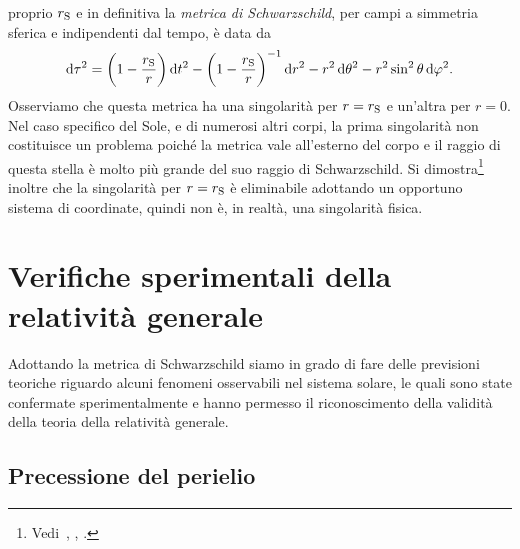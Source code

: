 proprio $r_{\textup{S}}$ e in definitiva la
\emph{metrica di Schwarzschild}, per campi a
simmetria sferica e indipendenti dal tempo, è data da
\begin{equation}
  \label{eq:metrica-schwarzschild}
  \mathop{}\!\mathrm{d}\tau^{2} = \bigg(1 - \frac{r_{\textup{S}}}{r} \bigg) \mathop{}\!\mathrm{d} t^{2} - \bigg(1 -
  \frac{r_{\textup{S}}}{r}\bigg)^{-1}\mathop{}\!\mathrm{d} r^{2} - r^{2}\mathop{}\!\mathrm{d}\theta^{2} -
  r^{2}\sin^{2}\theta \mathop{}\!\mathrm{d}\varphi^{2}.
\end{equation}
Osserviamo che questa metrica ha una singolarità per $r = r_{\textup{S}}$ e
un'altra per $r = 0$.  Nel caso specifico del Sole, e di numerosi altri corpi,
la prima singolarità non costituisce un problema poiché la metrica vale
all'esterno del corpo e il raggio di questa stella è molto più grande del suo
raggio di Schwarzschild.  Si
dimostra\footnote{Vedi~\textcite[511]{barone:relativita},
  \textcite[403-404]{landau:campi}, \textcite[207-208]{weinberg:gravitation}.}
inoltre che la singolarità per $r = r_{\textup{S}}$ è eliminabile adottando un
opportuno sistema di coordinate, quindi non è, in realtà, una singolarità
fisica.

\section{Verifiche sperimentali della relatività generale}
\label{sec:verififiche-relativita}

Adottando la metrica di Schwarzschild siamo in grado di fare delle previsioni
teoriche riguardo alcuni fenomeni osservabili nel sistema solare, le quali sono
state confermate sperimentalmente e hanno permesso il riconoscimento della
validità della teoria della relatività generale.

\subsection{Precessione del perielio}
\label{sec:precessione-perielio}

